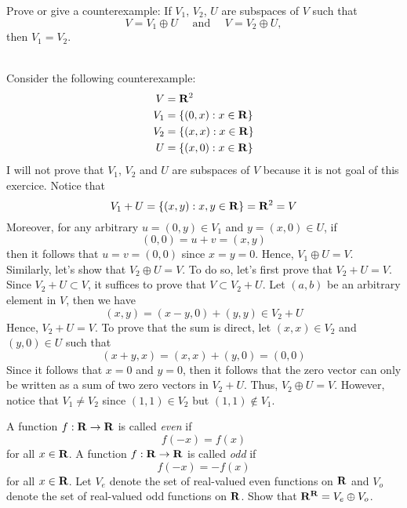 \begin{exercise}
    Prove or give a counterexample: If $V_1$, $V_2$, $U$ are subspaces of $V$ such that
    $$V = V_1 \oplus U \quad \text{ and } \quad V = V_2 \oplus U,$$
    then $V_1 = V_2$. \\
\end{exercise}

\begin{solution}
    \\ Consider the following counterexample:
    \begin{align*}
        V &= \mathbf{R}^2 \\
        V_1 &= \{(0, x) : x\in \mathbf{R}\} \\
        V_2 &= \{(x,x) : x \in \mathbf{R}\} \\
        U &= \{(x,0) : x \in \mathbf{R}\}
    \end{align*}
    I will not prove that $V_1$, $V_2$ and $U$ are subspaces of $V$ because it is not goal of this exercice. Notice that 
    $$V_1 + U = \{(x,y) : x,y \in \mathbf{R}\} = \mathbf{R}^2 = V $$
    Moreover, for any arbitrary $u = (0,y) \in V_1$ and $y = (x,0) \in U$, if
    $$(0,0) = u+v = (x,y)$$
    then it follows that $u=v = (0,0)$ since $x=y=0$. Hence, $V_1 \oplus U = V$. Similarly, let's show that $V_2 \oplus U = V$. To do so, let's first prove that $V_2 + U = V$. Since $V_2 + U \subset V$, it suffices to prove that $V \subset V_2 + U$. Let $(a,b)$ be an arbitrary element in $V$, then we have
    $$(x,y) = (x-y, 0) + (y,y) \in V_2 + U$$
    Hence, $V_2 + U = V$. To prove that the sum is direct, let $(x,x) \in V_2$ and $(y,0) \in U$ such that
    $$(x+y,x) = (x,x) + (y,0) = (0,0)$$
    Since it follows that $x=0$ and $y=0$, then it follows that the zero vector can only be written as a sum of two zero vectors in $V_2 + U$. Thus, $V_2 \oplus U = V$. However, notice that $V_1 \neq V_2$ since $(1,1) \in V_2$ but $(1,1) \notin V_1$. \\
\end{solution}

\begin{exercise}
    A function $f:\mathbf{R} \to \mathbf{R}$ is called \textit{even} if
    $$f(-x) = f(x)$$
    for all $x \in \mathbf{R}$. A function $f:\mathbf{R} \to \mathbf{R}$ is called \textit{odd} if
    $$f(-x) = -f(x)$$
    for all $x \in \mathbf{R}$. Let $V_e$ denote the set of real-valued even functions on $\mathbf{R}$ and $V_o$ denote the set of real-valued odd functions on $\mathbf{R}$. Show that $\mathbf{R}^{\mathbf{R}} = V_e \oplus V_o$. \\
\end{exercise}

